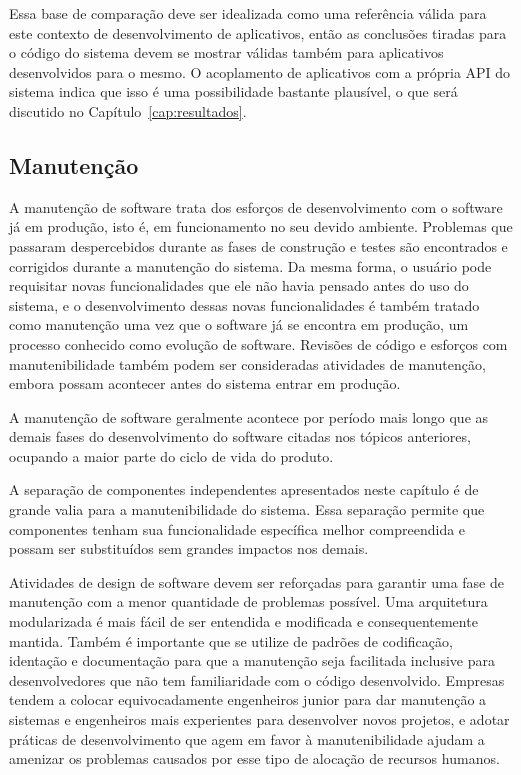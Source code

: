 Essa base de comparação deve ser idealizada como uma referência válida para este contexto de desenvolvimento de aplicativos, então as conclusões tiradas para o código do sistema devem se mostrar válidas também para aplicativos desenvolvidos para o mesmo. O acoplamento de aplicativos com a própria API do sistema indica que isso é uma possibilidade bastante plausível, o que será discutido no Capítulo~\ref{cap:resultados}. 

\subsection{Manutenção}

A manutenção de software trata dos esforços de desenvolvimento com o software já em produção, isto é, em funcionamento no seu devido ambiente. Problemas que passaram despercebidos durante as fases de construção e testes são encontrados e corrigidos durante a manutenção do sistema. Da mesma forma, o usuário pode requisitar novas funcionalidades que ele não havia pensado antes do uso do sistema, e o desenvolvimento dessas novas funcionalidades é também tratado como manutenção uma vez que o software já se encontra em produção, um processo conhecido como evolução de software. Revisões de código e esforços com manutenibilidade também podem ser consideradas atividades de manutenção, embora possam acontecer antes do sistema entrar em produção.

A manutenção de software geralmente acontece por período mais longo que as demais fases do desenvolvimento do software citadas nos tópicos anteriores, ocupando a maior parte do ciclo de vida do produto.

A separação de componentes independentes apresentados neste capítulo é de grande valia para a manutenibilidade do sistema. Essa separação permite que componentes tenham sua funcionalidade específica melhor compreendida e possam ser substituídos sem grandes impactos nos demais. 

Atividades de design de software devem ser reforçadas para garantir uma fase de manutenção com a menor quantidade de problemas possível. Uma arquitetura modularizada é mais fácil de ser entendida e modificada e consequentemente mantida. Também é importante que se utilize de padrões de codificação, identação e documentação para que a manutenção seja facilitada inclusive para desenvolvedores que não tem familiaridade com o código desenvolvido. Empresas tendem a colocar equivocadamente engenheiros junior para dar manutenção a sistemas e engenheiros mais experientes para desenvolver novos projetos, e adotar práticas de desenvolvimento que agem em favor à manutenibilidade ajudam a amenizar os problemas causados por esse tipo de alocação de recursos humanos.

